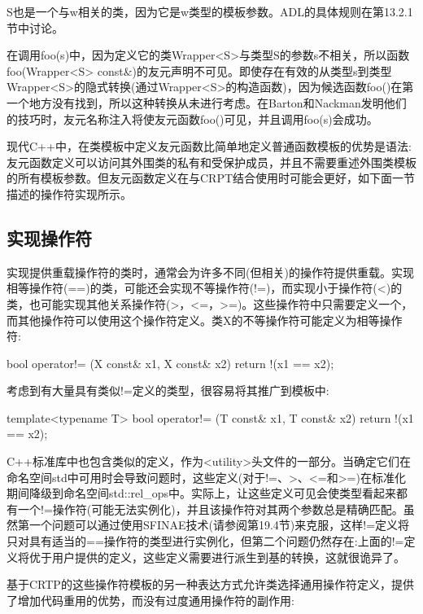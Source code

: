 \begin{notice}
S也是一个与w相关的类，因为它是w类型的模板参数。ADL的具体规则在第13.2.1节中讨论。
\end{notice}

在调用foo(s)中，因为定义它的类Wrapper<S>与类型S的参数s不相关，所以函数foo(Wrapper<S> const\&)的友元声明不可见。即使存在有效的从类型s到类型Wrapper<S>的隐式转换(通过Wrapper<S>的构造函数)，因为候选函数foo()在第一个地方没有找到，所以这种转换从未进行考虑。在Barton和Nackman发明他们的技巧时，友元名称注入将使友元函数foo()可见，并且调用foo(s)会成功。

现代C++中，在类模板中定义友元函数比简单地定义普通函数模板的优势是语法:友元函数定义可以访问其外围类的私有和受保护成员，并且不需要重述外围类模板的所有模板参数。但友元函数定义在与CRPT结合使用时可能会更好，如下面一节描述的操作符实现所示。

\subsection{实现操作符}

实现提供重载操作符的类时，通常会为许多不同(但相关)的操作符提供重载。实现相等操作符(==)的类，可能还会实现不等操作符(!=)，而实现小于操作符(<)的类，也可能实现其他关系操作符(>，<=，>=)。这些操作符中只需要定义一个，而其他操作符可以使用这个操作符定义。类X的不等操作符可能定义为相等操作符:

\begin{cpp}
bool operator!= (X const& x1, X const& x2) {
	return !(x1 == x2);
}
\end{cpp}

考虑到有大量具有类似!=定义的类型，很容易将其推广到模板中:

\begin{cpp}
template<typename T>
bool operator!= (T const& x1, T const& x2) {
	return !(x1 == x2);
}
\end{cpp}

C++标准库中也包含类似的定义，作为<utility>头文件的一部分。当确定它们在命名空间std中可用时会导致问题时，这些定义(对于!=、>、<=和>=)在标准化期间降级到命名空间std::rel\_ops中。实际上，让这些定义可见会使类型看起来都有一个!=操作符(可能无法实例化)，并且该操作符对其两个参数总是精确匹配。虽然第一个问题可以通过使用SFINAE技术(请参阅第19.4节)来克服，这样!=定义将只对具有适当的==操作符的类型进行实例化，但第二个问题仍然存在:上面的!=定义将优于用户提供的定义，这些定义需要进行派生到基的转换，这就很诡异了。

基于CRTP的这些操作符模板的另一种表达方式允许类选择通用操作符定义，提供了增加代码重用的优势，而没有过度通用操作符的副作用:

